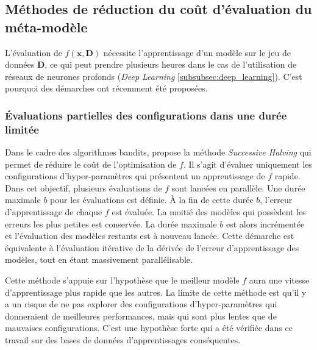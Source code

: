 
\subsection{Méthodes de réduction du coût d'évaluation du méta-modèle} \label{subsec:reduce_opt}
L'évaluation de $f(\boldsymbol{x}, \boldsymbol{D})$ nécessite l'apprentissage d'un modèle sur le jeu de données $\boldsymbol{D}$, ce qui peut prendre plusieurs heures dans le cas de l'utilisation de réseaux de neurones profonds (\textit{Deep Learning} \ref{subsubsec:deep_learning}).
C'est pourquoi des démarches ont récemment été proposées.

\subsubsection{Évaluations partielles des configurations dans une durée limitée} \label{subsubsec:successive_halving}
Dans le cadre des algorithmes bandits, \cite{jamieson_nonstochastic_2015} propose la méthode \textit{Successive Halving} qui permet de réduire le coût de l'optimisation de $f$.
Il s'agit d'évaluer uniquement les configurations d'hyper-paramètres qui présentent un apprentissage de $f$ rapide.
Dans cet objectif, plusieurs évaluations de $f$ sont lancées en parallèle.
Une durée maximale $b$ pour les évaluations est définie.
À la fin de cette durée $b$, l'erreur d'apprentissage de chaque $f$ est évaluée.
La moitié des modèles qui possèdent les erreurs les plus petites est conservée.
La durée maximale $b$ est alors incrémentée et l'évaluation des modèles restants est à nouveau lancée.
Cette démarche est équivalente à l'évaluation itérative de la dérivée de l'erreur d'apprentissage des modèles, tout en étant massivement parallélisable.

Cette méthode s'appuie sur l'hypothèse que le meilleur modèle $f$ aura une vitesse d'apprentissage plus rapide que les autres.
La limite de cette méthode est qu'il y a un risque de ne pas explorer des configurations d'hyper-paramètres qui donneraient de meilleures performances, mais qui sont plus lentes que de mauvaises configurations.
C'est une hypothèse forte qui a été vérifiée dans ce travail sur des bases de données d'apprentissages conséquentes.

